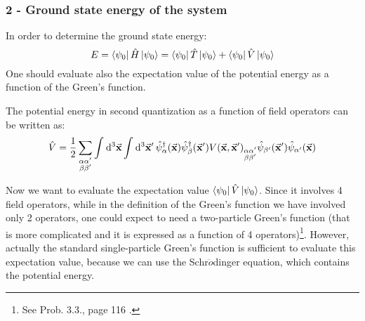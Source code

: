 \documentclass[../main/main.tex]{subfiles}
\begin{document}
\subsubsection{2 - Ground state energy of the system}
In order to determine the ground state energy: 
\begin{equation*}
  E = \bra{\psi _0} \hat{H} \ket{\psi _0 }
  = \bra{\psi _0 } \hat{T} \ket{\psi _0} + \bra{\psi _0} \hat{V} \ket{\psi _0}
\end{equation*}
One should evaluate also the expectation value of the potential energy as a function of the Green's function.

The potential energy in second quantization as a function of field operators can be written as:
  \begin{equation*}
    \hat{V} = \frac{1}{2} \sum_{\substack{\alpha \alpha' \\ \beta \beta' }  }^{} \int_{}^{} \dd[3]{\va{x}}
    \int_{}^{} \dd[3]{\va{x}'} \hat{\psi }_ \alpha ^\dag (\va{x})
    \hat{\psi }_ \beta ^\dag (\va{x}') V (\va{x},\va{x}')_{\substack{ \alpha \alpha' \\ \beta \beta' } } \hat{\psi }_ {\beta'} (\va{x}') \hat{\psi }_ {\alpha '} (\va{x})
  \end{equation*}

Now we want to evaluate the expectation value \( \bra{\psi _0} \hat{V} \ket{\psi _0}    \).
Since it involves 4 field operators, while in the definition of the Green's function we have involved only 2 operators, one could expect to need a two-particle Green's function (that is more complicated and it is expressed as a function of 4 operators)\footnote{See Prob. 3.3., page 116 \cite{fetter}.}.
However, actually the standard single-particle Green's function is sufficient to evaluate this expectation value, because we can use the Schr$\ddot{o}$dinger equation, which contains the potential energy.
\end{document}

